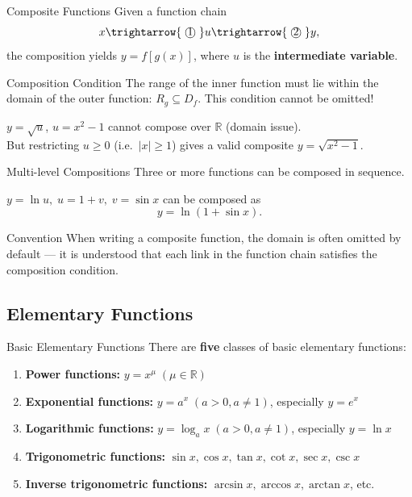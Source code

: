 \documentclass[aspectratio=169,10pt]{beamer}
\begin{document}
\begin{frame}{Composite Functions}
  Given a function chain
  \[
    x \trightarrow{\;\text{\textcircled{1}}\;} u \trightarrow{\;\text{\textcircled{2}}\;} y,
  \]
  the composition yields $y=f[g(x)]$, where $u$ is the \textbf{intermediate variable}.
  \pause
  \begin{alertblock}{Composition Condition}
    The range of the inner function must lie within the domain of the outer function:
    $R_g \subseteq D_f$. This condition cannot be omitted!
  \end{alertblock}
  \pause
  \begin{example}
    $y=\sqrt{u}$, $u=x^2-1$ cannot compose over $\mathbb{R}$ (domain issue).\\
    But restricting $u\ge 0$ (i.e.\ $|x|\ge 1$) gives a valid composite $y=\sqrt{x^2-1}$.
  \end{example}
\end{frame}

\begin{frame}{Multi-level Compositions}
  Three or more functions can be composed in sequence.
  \pause
  \begin{example}
    $y=\ln u,\; u=1+v,\; v=\sin x$ can be composed as
    \[
      y = \ln(1+\sin x).
    \]
  \end{example}
  \pause
  \begin{block}{Convention}
    When writing a composite function, the domain is often omitted by default ---
    it is understood that each link in the function chain satisfies the composition condition.
  \end{block}
\end{frame}

\subsection{Elementary Functions}

\begin{frame}{Basic Elementary Functions}
  There are \textbf{five} classes of basic elementary functions:
  \pause
  \begin{enumerate}
    \item<2-> \textbf{Power functions:} $y=x^\mu\;(\mu\in\mathbb{R})$
    \item<3-> \textbf{Exponential functions:} $y=a^x\;(a>0,a\neq1)$, especially $y=e^x$
    \item<4-> \textbf{Logarithmic functions:} $y=\log_a x\;(a>0,a\neq1)$, especially $y=\ln x$
    \item<5-> \textbf{Trigonometric functions:} $\sin x,\cos x,\tan x,\cot x,\sec x,\csc x$
    \item<6-> \textbf{Inverse trigonometric functions:} $\arcsin x,\arccos x,\arctan x$, etc.
  \end{enumerate}
\end{frame}
\end{document}

